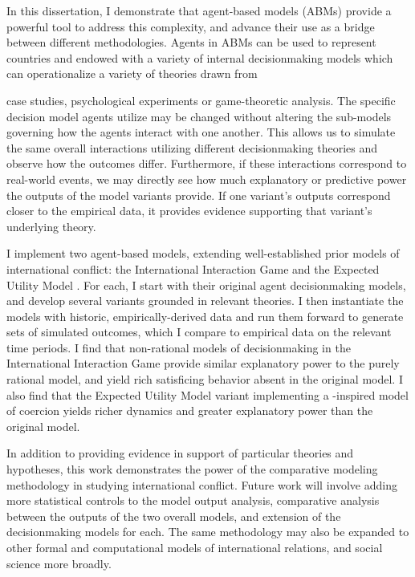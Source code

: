 \documentclass[11 pt]{report}
\begin{document}
In this dissertation, I demonstrate that agent-based models (ABMs) provide a powerful tool to address this complexity, and advance their use as a bridge between different methodologies. Agents in ABMs can be used to represent countries and endowed with a variety of internal decisionmaking models which can operationalize a variety of theories drawn from

\abstractmultiplepage
\noindent case studies, psychological experiments or game-theoretic analysis. The specific decision model agents utilize may be changed without altering the sub-models governing how the agents interact with one another. This allows us to simulate the same overall interactions utilizing different decisionmaking theories and observe how the outcomes differ. Furthermore, if these interactions correspond to real-world events, we may directly see how much explanatory or predictive power the outputs of the model variants provide. If one variant's outputs correspond closer to the empirical data, it provides evidence supporting that variant's underlying theory.

I implement two agent-based models, extending well-established prior models of international conflict: the International Interaction Game \citep{bdm_1992} and the Expected Utility Model \citep{bdm_2002}. For each, I start with their original agent decisionmaking models, and develop several variants grounded in relevant theories. I then instantiate the models with historic, empirically-derived data and run them forward to generate sets of simulated outcomes, which I compare to empirical data on the relevant time periods. I find that non-rational models of decisionmaking in the International Interaction Game provide similar explanatory power to the purely rational model, and yield rich satisficing behavior absent in the original model. I also find that the Expected Utility Model variant implementing a \citet{schelling_1966}-inspired model of coercion yields richer dynamics and greater explanatory power than the original model.

In addition to providing evidence in support of particular theories and hypotheses, this work demonstrates the power of the comparative modeling methodology in studying international conflict. Future work will involve adding more statistical controls to the model output analysis, comparative analysis between the outputs of the two overall models, and extension of the decisionmaking models for each. The same methodology may also be expanded to other formal and computational models of international relations, and social science more broadly.
\end{document}
